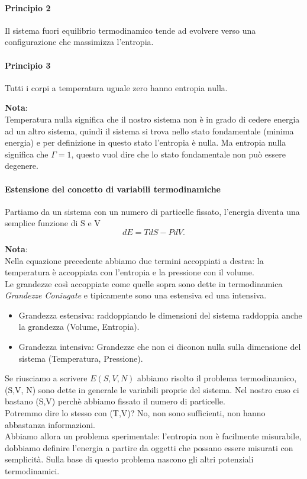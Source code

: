 \paragraph{Principio 2}%
Il sistema fuori equilibrio termodinamico tende ad evolvere verso una configurazione che massimizza l'entropia.
\paragraph{Principio 3}%
Tutti i corpi a temperatura uguale zero hanno entropia nulla.\\
\begin{framed}
\noindent \textbf{Nota}: \\
Temperatura nulla significa che il nostro sistema non è in grado di cedere energia ad un altro sistema, quindi il sistema si trova nello stato fondamentale (minima energia) e per definizione in questo stato l'entropia è nulla. Ma entropia nulla significa che $\Gamma=1$, questo vuol dire che lo stato fondamentale non può essere degenere.
\end{framed}
\noindent 

\paragraph{Estensione del concetto di variabili termodinamiche}%
Partiamo da un sistema con un numero di particelle fissato, l'energia diventa una semplice funzione di S e V
\[
	dE = TdS - PdV
.\] 
\begin{framed}
\noindent \textbf{Nota}: \\
Nella equazione precedente abbiamo due termini accoppiati a destra: la temperatura è accoppiata con l'entropia e la pressione con il volume.\\
Le grandezze così accoppiate come quelle sopra sono dette in termodinamica \textit{Grandezze Coniugate} e tipicamente sono una estensiva ed una intensiva.
\begin{itemize}
	\item Grandezza estensiva: raddoppiando le dimensioni del sistema raddoppia anche la grandezza (Volume, Entropia).
	\item Grandezza intensiva: Grandezze che non ci diconon nulla sulla dimensione del sistema (Temperatura, Pressione).
\end{itemize}
\end{framed}
\noindent 
Se riusciamo a scrivere $E\left( S,V,N \right)$ abbiamo risolto il problema termodinamico, (S,V, N) sono dette in generale le variabili proprie del sistema. Nel nostro caso ci bastano (S,V) perchè abbiamo fissato il numero di particelle. \\
Potremmo dire lo stesso con (T,V)? No, non sono sufficienti, non hanno abbastanza informazioni.\\
Abbiamo allora un problema sperimentale: l'entropia non è facilmente misurabile, dobbiamo definire l'energia a partire da oggetti che possano essere misurati con semplicità. Sulla base di questo problema nascono gli altri potenziali termodinamici. 
